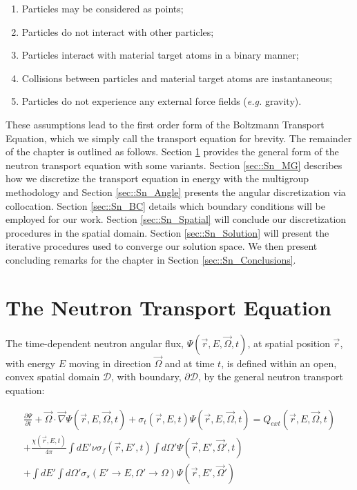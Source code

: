 \begin{enumerate}
	\item Particles may be considered as points;
	\item Particles do not interact with other particles;
	\item Particles interact with material target atoms in a binary manner;
	\item Collisions between particles and material target atoms are instantaneous;
	\item Particles do not experience any external force fields ({\em e.g.} gravity).
\end{enumerate}

These assumptions lead to the first order form of the Boltzmann Transport Equation, which we simply call the transport equation for brevity. The remainder of the chapter is outlined as follows. Section \ref{sec::Sn_neut} provides the general form of the neutron transport equation with some variants. Section \ref{sec::Sn_MG} describes how we discretize the transport equation in energy with the multigroup methodology and Section \ref{sec::Sn_Angle} presents the angular discretization via collocation. Section \ref{sec::Sn_BC} details which boundary conditions will be employed for our work. Section \ref{sec::Sn_Spatial} will conclude our discretization procedures in the spatial domain. Section \ref{sec::Sn_Solution} will present the iterative procedures used to converge our solution space. We then present concluding remarks for the chapter in Section \ref{sec::Sn_Conclusions}.

\section{The Neutron Transport Equation}
\label{sec::Sn_neut}

The time-dependent neutron angular flux, $\Psi (\vec{r}, E, \vec{\Omega}, t)$, at spatial position $\vec{r}$, with energy $E$ moving in direction $\vec{\Omega}$ and at time $t$, is defined within an open, convex spatial domain $\mathcal{D}$, with boundary, $\partial \mathcal{D}$, by the general neutron transport equation:


\begin{equation}
\label{eq::Sn_transport_eq_full}
\begin{aligned}
	\frac{\partial \Psi}{\partial t} + \vec{\Omega} \cdot \vec{\nabla} \Psi (\vec{r}, E, \vec{\Omega},t)+ \sigma_t (\vec{r}, E,t) \Psi (\vec{r}, E, \vec{\Omega},t) =Q_{ext} (\vec{r}, E, \vec{\Omega},t) \\
	+ \frac{\chi (\vec{r}, E,t)}{4 \pi} \int dE' \nu \sigma_f (\vec{r}, E',t) \int d\Omega' \Psi (\vec{r}, E', \vec{\Omega}',t) \\ 
	+ \int dE' \int d\Omega' \sigma_s (E' \rightarrow E, \Omega' \rightarrow \Omega) \Psi (\vec{r}, E', \vec{\Omega}')
\end{aligned}
\end{equation}

